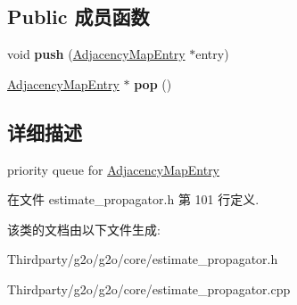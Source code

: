 \subsection*{Public 成员函数}
\begin{DoxyCompactItemize}
\item 
\hypertarget{classg2o_1_1EstimatePropagator_1_1PriorityQueue_ac89681b92b921412ff432f14028f481e}{void {\bfseries push} (\hyperlink{classg2o_1_1EstimatePropagator_1_1AdjacencyMapEntry}{Adjacency\-Map\-Entry} $\ast$entry)}\label{classg2o_1_1EstimatePropagator_1_1PriorityQueue_ac89681b92b921412ff432f14028f481e}

\item 
\hypertarget{classg2o_1_1EstimatePropagator_1_1PriorityQueue_a82a20f1ebc44dfe305f65ceae7860a85}{\hyperlink{classg2o_1_1EstimatePropagator_1_1AdjacencyMapEntry}{Adjacency\-Map\-Entry} $\ast$ {\bfseries pop} ()}\label{classg2o_1_1EstimatePropagator_1_1PriorityQueue_a82a20f1ebc44dfe305f65ceae7860a85}

\end{DoxyCompactItemize}


\subsection{详细描述}
priority queue for \hyperlink{classg2o_1_1EstimatePropagator_1_1AdjacencyMapEntry}{Adjacency\-Map\-Entry} 

在文件 estimate\-\_\-propagator.\-h 第 101 行定义.



该类的文档由以下文件生成\-:\begin{DoxyCompactItemize}
\item 
Thirdparty/g2o/g2o/core/estimate\-\_\-propagator.\-h\item 
Thirdparty/g2o/g2o/core/estimate\-\_\-propagator.\-cpp\end{DoxyCompactItemize}
